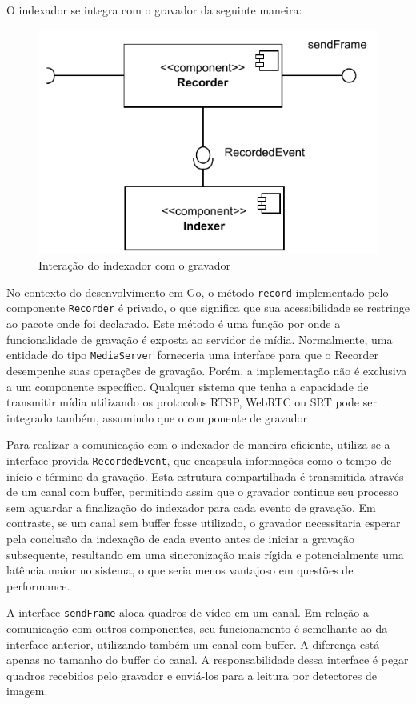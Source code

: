 \documentclass[12pt, %
openright, 
oneside, %
a4paper,    %
brazil]{facom-ufu-abntex2}
\begin{document}
O indexador se integra com o gravador da seguinte maneira:

\begin{figure}[!ht]
	\centering
	\includegraphics[width=0.7\linewidth]{recorder_indexer.pdf}
	\caption[Interação do indexador com o gravador]{Interação do indexador com o gravador}
	\label{fig:graficosVariandoTamanhoRede}
\end{figure}

No contexto do desenvolvimento em Go, o método \texttt{record} implementado
pelo componente \texttt{Recorder} é privado, o que significa que sua
acessibilidade se restringe ao pacote onde foi declarado. Este método é uma
função por onde a funcionalidade de gravação é exposta ao servidor de mídia.
Normalmente, uma entidade do tipo \texttt{MediaServer} forneceria uma interface
para que o Recorder desempenhe suas operações de gravação. Porém, a
implementação não é exclusiva a um componente específico. Qualquer sistema que
tenha a capacidade de transmitir mídia utilizando os protocolos RTSP, WebRTC ou
SRT pode ser integrado também, assumindo que o componente de gravador

Para realizar a comunicação com o indexador de maneira eficiente, utiliza-se a
interface provida \texttt{RecordedEvent}, que encapsula informações como o
tempo de início e término da gravação. Esta estrutura compartilhada é
transmitida através de um canal com buffer, permitindo assim que o gravador
continue seu processo sem aguardar a finalização do indexador para cada evento
de gravação. Em contraste, se um canal sem buffer fosse utilizado, o gravador
necessitaria esperar pela conclusão da indexação de cada evento antes de
iniciar a gravação subsequente, resultando em uma sincronização mais rígida e
potencialmente uma latência maior no sistema, o que seria menos vantajoso em
questões de performance.

A interface \texttt{sendFrame} aloca quadros de vídeo em um canal. Em relação a
comunicação com outros componentes, seu funcionamento é semelhante ao da
interface anterior, utilizando também um canal com buffer. A diferença está
apenas no tamanho do buffer do canal. A responsabilidade dessa interface é
pegar quadros recebidos pelo gravador e enviá-los para a leitura por detectores
de imagem.
\end{document}
